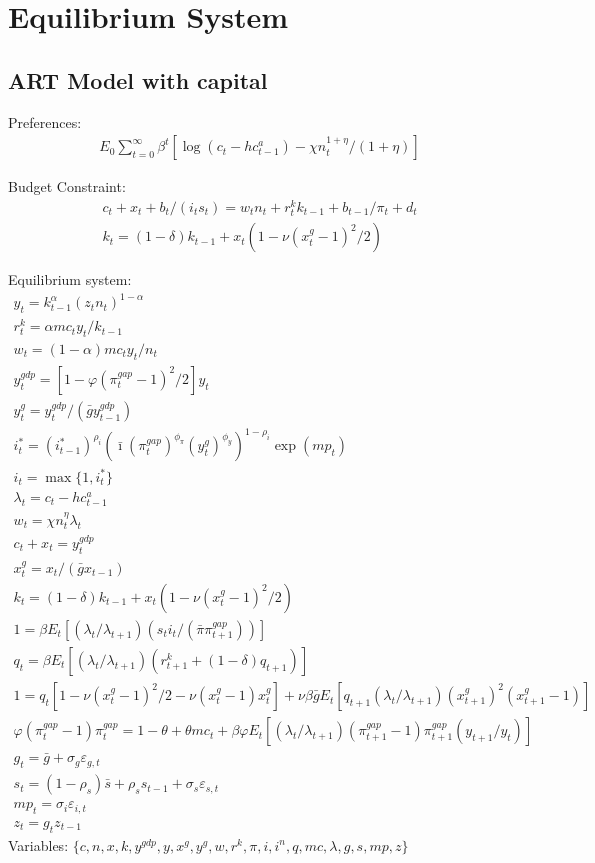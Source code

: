 \documentclass[12pt, final]{article}
\begin{document}
\section{Equilibrium System}

\subsection{ART Model with capital}
\noindent Preferences:
\begin{gather*}
  E_0\textstyle\sum_{t=0}^\infty\beta^t [\log(c_t-hc^a_{t-1})-\chi n_t^{1+\eta}/(1+\eta)]
\end{gather*}

\noindent Budget Constraint:
\begin{gather*}
  c_t+x_t+b_t/(i_ts_t)=w_tn_t+r_t^kk_{t-1}+b_{t-1}/\pi_t+d_t\\
  k_t = (1-\delta)k_{t-1} + x_t(1 - \nu(x^g_t-1)^2/2)
\end{gather*}

\setcounter{equation}{0}
\noindent Equilibrium system:
\small\begin{gather}
y_t = k_{t-1}^\alpha(z_t n_t)^{1-\alpha}\\ %
r_t^k = \alpha mc_ty_t/k_{t-1}\\
w_t = (1-\alpha)mc_ty_t/n_t\\
y_t^{gdp} = [1 - \varphi(\pi_t^{gap}-1)^2/2]y_t \\
y^g_t = y^{gdp}_t/(\bar{g}y^{gdp}_{t-1})\\
i_t^*=(i^*_{t-1})^{\rho_i}(\bar{\imath}(\pi^{gap}_t)^{\phi_\pi}(y^{g}_{t})^{\phi_y})^{1-\rho_i}\exp(mp_t)\\
i_t=\max\{1,i_t^*\}\\
\lambda_t = c_t - hc^a_{t-1} \\
w_t = \chi n_t^\eta \lambda_t\\
c_t + x_t = y_t^{gdp}\\
x_t^g = x_t/(\bar{g}x_{t-1})\\
k_t = (1-\delta)k_{t-1}+x_t(1-\nu(x_t^g-1)^2/2) \\%
1 =  \beta E_t[(\lambda_t/\lambda_{t+1})(s_ti_t/(\bar{\pi}\pi_{t+1}^{gap}))]\\
q_t = \beta E_t[(\lambda_t/\lambda_{t+1})(r^k_{t+1}+(1-\delta)q_{t+1})]\\
1 = q_t[1-\nu(x^g_t-1)^2/2 - \nu(x_t^g-1)x_t^g] + \nu\beta\bar{g}E_t[q_{t+1}(\lambda_t/\lambda_{t+1})(x^g_{t+1})^2(x^g_{t+1}-1)]\\
\varphi(\pi_t^{gap}-1)\pi_t^{gap} = 1-\theta + \theta mc_t + \beta\varphi E_t[(\lambda_t/\lambda_{t+1})(\pi_{t+1}^{gap}-1)\pi_{t+1}^{gap}(y_{t+1}/y_t)]\\
g_t = \bar{g} + \sigma_g\varepsilon_{g,t}\\
s_t=(1-\rho_s)\bar{s}+\rho_ss_{t-1} + \sigma_s\varepsilon_{s,t}\\
mp_t = \sigma_i\varepsilon_{i,t}\\
  z_t=g_tz_{t-1}
\end{gather}\normalsize
Variables: $\{c,n,x,k,y^{gdp},y,x^g,y^g,w,r^k,\pi,i,i^n,q,mc,\lambda,g,s,mp,z\}$\\
\end{document}
